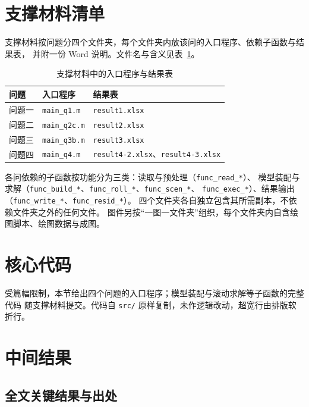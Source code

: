 \section{支撑材料清单}

支撑材料按问题分四个文件夹，每个文件夹内放该问的入口程序、依赖子函数与结果表，
并附一份 Word 说明。文件名与含义见表~\ref{tab:a-files}。

\begin{table}[H]
\centering
{}
\begin{tabular}{lll}
\toprule
问题 & 入口程序 & 结果表 \\
\midrule
问题一 & \texttt{main\_q1.m} & \texttt{result1.xlsx} \\
问题二 & \texttt{main\_q2c.m} & \texttt{result2.xlsx} \\
问题三 & \texttt{main\_q3b.m} & \texttt{result3.xlsx} \\
问题四 & \texttt{main\_q4.m} & \texttt{result4-2.xlsx}、\texttt{result4-3.xlsx} \\
\bottomrule
\end{tabular}
\caption{支撑材料中的入口程序与结果表}
\label{tab:a-files}
\end{table}

各问依赖的子函数按功能分为三类：读取与预处理（\texttt{func\_read\_*}）、
模型装配与求解（\texttt{func\_build\_*}、\texttt{func\_roll\_*}、\texttt{func\_scen\_*}、
\texttt{func\_exec\_*}）、结果输出（\texttt{func\_write\_*}、\texttt{func\_resid\_*}）。
四个文件夹各自独立包含其所需副本，不依赖文件夹之外的任何文件。
图件另按“一图一文件夹”组织，每个文件夹内自含绘图脚本、绘图数据与成图。

\section{核心代码}

受篇幅限制，本节给出四个问题的入口程序；模型装配与滚动求解等子函数的完整代码
随支撑材料提交。代码自 \texttt{src/} 原样复制，未作逻辑改动，超宽行由排版软折行。



\section{中间结果}

\subsection{全文关键结果与出处}

